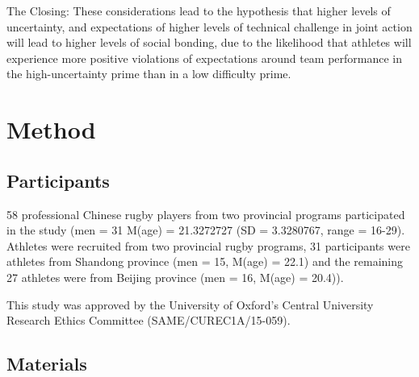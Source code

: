 \documentclass[english]{article}\usepackage[]{graphicx}\usepackage[]{color}
\begin{document}
The Closing:
These considerations lead to the hypothesis that higher levels of uncertainty, and expectations of higher levels of technical challenge in joint action will lead to higher levels of social bonding, due to the likelihood that athletes will experience more positive violations of expectations around team performance in the high-uncertainty prime than in a low difficulty prime.




\section{Method}

\subsection{Participants}
58 professional Chinese rugby players from two provincial programs participated in the study (men = 31 M(age) = 21.3272727 (SD = 3.3280767, range = 16-29). Athletes were recruited from two provincial rugby programs,  31 participants were athletes from Shandong province (men = 15, M(age) = 22.1) and the remaining 27 athletes were from Beijing province (men = 16, M(age) = 20.4)).

This study was approved by the University of Oxford’s Central University Research Ethics Committee (SAME/CUREC1A/15-059).


\subsection{Materials}
\end{document}
